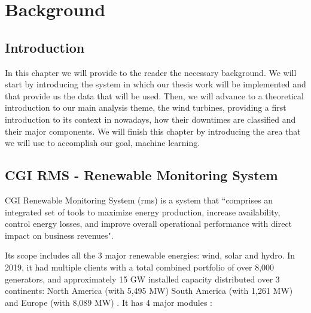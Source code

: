 


\chapter{Background}
\label{cha:background}


\section{Introduction} 
\label{sub:if_you_use_this_template} 

In this chapter we will provide to the reader the necessary background. We will start by introducing the system in which our thesis work will be implemented and that provide us the data that will be used. Then, we will advance to a theoretical introduction to our main analysis theme, the wind turbines, providing a first introduction to its context in nowadays, how their downtimes are classified and their major components. We will finish this chapter by introducing the area that we will use to accomplish our goal, machine learning.

\section{CGI RMS - Renewable Monitoring System} 
\label{sub:if_you_use_this_template} 

CGI Renewable Monitoring System (\acrshort{rms}) is a system that “comprises an integrated set of tools to maximize energy production, increase availability, control energy losses, and improve overall operational performance with direct impact on business revenues".

Its scope includes all the 3 major renewable energies: wind, solar and hydro. In 2019, it had multiple clients with a total combined portfolio of over 8,000 generators, and approximately 15 GW installed capacity distributed over 3 continents: North America (with 5,495 MW) South America (with 1,261 MW) and Europe (with 8,089 MW) \cite{OLD_8}. It has 4 major modules \cite{OLD_8}:

